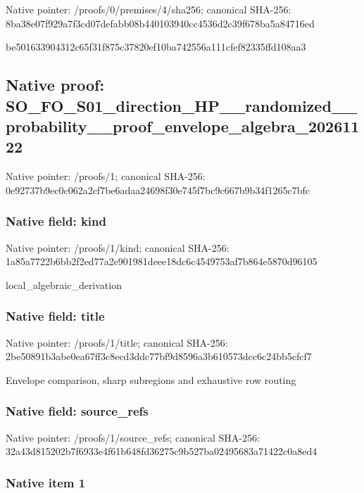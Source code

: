 \documentclass[10pt,a4paper]{article}
\begin{document}
Native pointer: /proofs/0/premises/4/sha256; canonical SHA-256: 8ba38e07f929a7f3cd07defa\allowbreak{}bb08b440103940cc4536d2c3\allowbreak{}9f678ba5a84716ed


be501633904312c65f31f875\allowbreak{}c37820ef10ba742556a111cf\allowbreak{}ef82335ffd108aa3


\subsection{Native proof: SO\_FO\_S01\_direction\_HP\_\_\allowbreak{}randomized\_\_probability\_\allowbreak{}\_proof\_envelope\_algebra\_\allowbreak{}20261122}


Native pointer: /proofs/1; canonical SHA-256: 0e92737b9ec0c062a2cf7be6\allowbreak{}adaa24698f30e745f7bc9c66\allowbreak{}7b9b34f1265c7bfc



\subsubsection{Native field: kind}


Native pointer: /proofs/1/kind; canonical SHA-256: 1a85a7722b6bb2f2ed77a2e9\allowbreak{}01981deee18dc6c4549753af\allowbreak{}7b864e5870d96105


local\_algebraic\_derivation


\subsubsection{Native field: title}


Native pointer: /proofs/1/title; canonical SHA-256: 2be50891b3abe0ea67ff3c8e\allowbreak{}cd3ddc77bf9d8596a3b61057\allowbreak{}3dcc6c24bb5cfcf7


Envelope comparison, sharp subregions and exhaustive row routing


\subsubsection{Native field: source\_refs}


Native pointer: /proofs/1/source\_refs; canonical SHA-256: 32a43d815202b7f6933e4f61\allowbreak{}b648fd36275c9b527ba02495\allowbreak{}683a71422c0a8ed4



\subsubsection{Native item 1}
\end{document}
